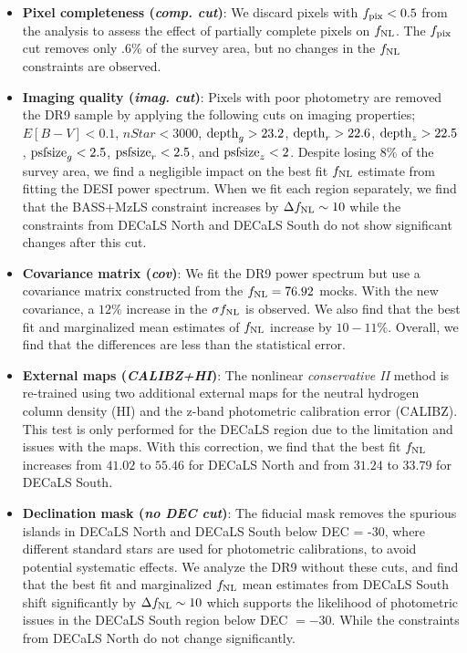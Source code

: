 \begin{itemize}
\item \textbf{Pixel completeness (\textit{comp. cut})}: We discard pixels with $f_{\rm pix} < 0.5$ from the analysis to assess the effect of partially complete pixels on $f_{\rm NL}$. The $f_{\rm pix}$ cut removes only $.6\%$ of the survey area, but no changes in the $f_{\rm NL}$ constraints are observed.

\item \textbf{Imaging quality (\textit{imag. cut})}: Pixels with poor photometry are removed the DR9 sample by applying the following cuts on imaging properties; $E[B-V]<0.1$, $nStar < 3000$, ${\rm depth}_{g} > 23.2$, ${\rm depth}_{r} > 22.6$, ${\rm depth}_{z} > 22.5$, ${\rm psfsize}_{g}<2.5$, ${\rm psfsize}_{r}<2.5$, and ${\rm psfsize}_{z}<2$. Despite losing $8\%$ of the survey area, we find a negligible impact on the best fit $f_{\rm NL}$ estimate from fitting the DESI power spectrum. When we fit each region separately, we find that the BASS+MzLS constraint increases by $\Delta f_{\rm NL} \sim 10$ while the constraints from DECaLS North and DECaLS South do not show significant changes after this cut. 

\item \textbf{Covariance matrix (\textit{cov})}: We fit the DR9 power spectrum but use a covariance matrix constructed from the $f_{\rm NL}=76.92$ mocks. With the new covariance, a $12\%$ increase in the $\sigma f_{\rm NL}$ is observed. We also find that the best fit and marginalized mean estimates of $f_{\rm NL}$ increase by $10-11\%$. Overall, we find that the differences are less than the statistical error.

\item \textbf{External maps (\textit{CALIBZ+HI})}: The nonlinear \textit{conservative II} method is re-trained using two additional external maps for the neutral hydrogen column density (HI) and the z-band photometric calibration error (CALIBZ). This test is only performed for the DECaLS region due to the limitation and issues with the maps. With this correction, we find that the best fit $f_{\rm NL}$ increases from $41.02$ to $55.46$ for DECaLS North and from $31.24$ to $33.79$ for DECaLS South.

\item \textbf{Declination mask (\textit{no DEC cut})}: The fiducial mask removes the spurious islands in DECaLS North and DECaLS South below DEC = -30, where different standard stars are used for photometric calibrations, to avoid potential systematic effects. We analyze the DR9 without these cuts, and find that the best fit and marginalized $f_{\rm NL}$ mean estimates from DECaLS South shift significantly by $\Delta f_{\rm NL} \sim 10$ which supports the likelihood of photometric issues in the DECaLS South region below DEC $=-30$. While the constraints from DECaLS North do not change significantly.


\end{itemize}
